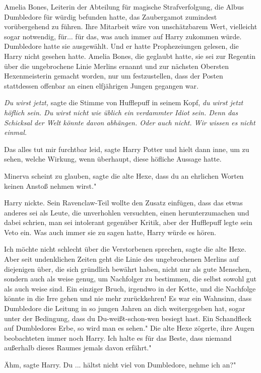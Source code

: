 Amelia Bones, Leiterin der Abteilung für magische Strafverfolgung, die Albus
Dumbledore für würdig befunden hatte, das Zaubergamot zumindest vorübergehend zu
führen. Ihre Mitarbeit wäre von unschätzbarem Wert, vielleicht sogar notwendig,
für... für das, was auch immer auf Harry zukommen würde. Dumbledore hatte sie
ausgewählt. Und er hatte Prophezeiungen gelesen, die Harry nicht gesehen hatte.
Amelia Bones, die geglaubt hatte, sie sei zur Regentin über die ungebrochene
Linie Merlins ernannt und zur nächsten Obersten Hexenmeisterin gemacht worden,
nur um festzustellen, dass der Posten stattdessen offenbar an einen elfjährigen
Jungen gegangen war.

\emph{Du wirst jetzt, }sagte die Stimme von Hufflepuff in seinem Kopf,\emph{ du
wirst jetzt höflich sein. Du wirst nicht wie üblich ein verdammter Idiot sein.
Denn das Schicksal der Welt könnte davon abhängen. Oder auch nicht. Wir wissen
es nicht einmal.}

\glqq Das alles tut mir furchtbar leid\grqq{}, sagte Harry Potter und hielt dann
inne, um zu sehen, welche Wirkung, wenn überhaupt, diese höfliche Aussage hatte.

\glqq Minerva scheint zu glauben\grqq{}, sagte die alte Hexe, \glqq dass du an
ehrlichen Worten keinen Anstoß nehmen wirst."

Harry nickte. Sein Ravenclaw-Teil wollte den Zusatz einfügen, dass das etwas
anderes sei als Leute, die unverhohlen versuchten, einen herunterzumachen und
dabei schrien, man sei intolerant gegenüber Kritik, aber der Hufflepuff legte
sein Veto ein. Was auch immer sie zu sagen hatte, Harry würde es hören.

\glqq Ich möchte nicht schlecht über die Verstorbenen sprechen\grqq{}, sagte die
alte Hexe. \glqq Aber seit undenklichen Zeiten geht die Linie des ungebrochenen
Merlins auf diejenigen über, die sich gründlich bewährt haben, nicht nur als
gute Menschen, sondern auch als weise genug, um Nachfolger zu bestimmen, die
selbst sowohl gut als auch weise sind. Ein einziger Bruch, irgendwo in der
Kette, und die Nachfolge könnte in die Irre gehen und nie mehr zurückkehren! Es
war ein Wahnsinn, dass Dumbledore die Leitung in so jungen Jahren an dich
weitergegeben hat, sogar unter der Bedingung, dass du Du-weißt-schon-wen besiegt
hast. Ein Schandfleck auf Dumbledores Erbe, so wird man es sehen." Die alte Hexe
zögerte, ihre Augen beobachteten immer noch Harry. \glqq Ich halte es für das
Beste, dass niemand außerhalb dieses Raumes jemals davon erfährt."

\glqq Ähm\grqq{}, sagte Harry. \glqq Du ... hältst nicht viel von Dumbledore,
nehme ich an?"


